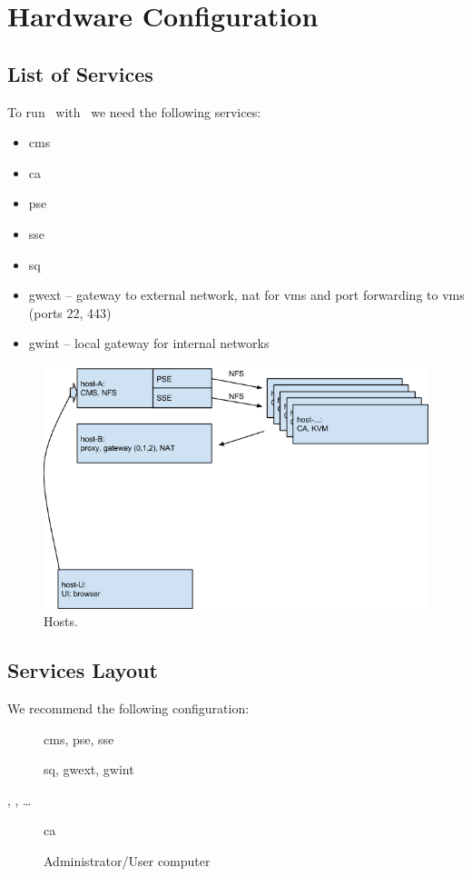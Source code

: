 \chapter{Hardware Configuration}
\label{cpt:hardware}


\section{List of Services}
\label{sct:hardware:services}

To run \cstack\ with \cernvm\ we need the following services:
\begin{itemize}
	\item \acrfull{cms}
	\item \acrfull{ca}
	\item \acrfull{pse}
	\item \acrfull{sse}
	\item \acrfull{sq}
	\item \acrfull{gwext} -- gateway to external network, \acrshort{nat} for \acrshort{vm}s and port forwarding to \acrshort{vm}s (ports 22, 443)
	\item \acrfull{gwint} -- local gateway for internal networks
\end{itemize}

\begin{figure}
	\begin{center}
		\includegraphics[width=\textwidth]{figures/hosts}
	\end{center}
	\caption{Hosts.}
	\label{fig:hardware:hosts}
\end{figure}



\section{Services Layout}
\label{sct:hardware:layout}
We recommend the following configuration:
\begin{description}
	\item[] \acrshort{cms}, \acrshort{pse}, \acrshort{sse}
	\item[] \acrshort{sq}, \acrshort{gwext}, \acrshort{gwint}
	\item[, , \dots] \acrshort{ca}
	\item[] Administrator/User computer
\end{description}

